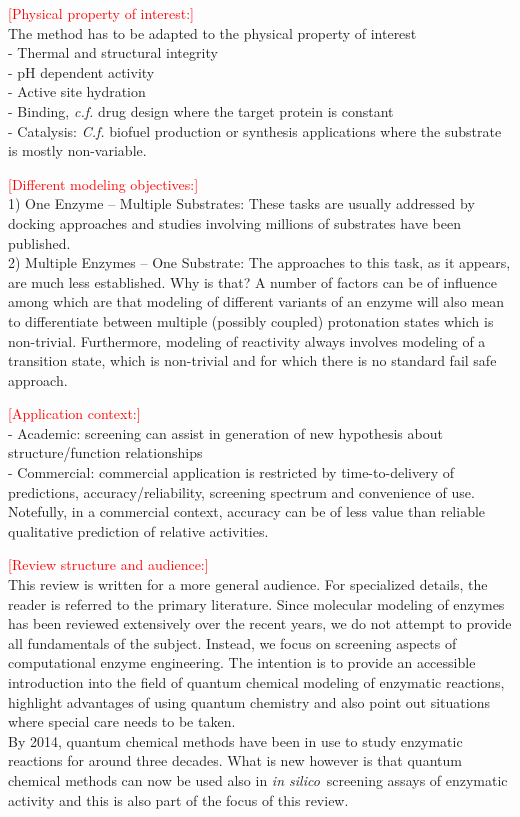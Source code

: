 \noindent\textcolor{red}{[Physical property of interest:]}\\
The method has to be adapted to the physical property of interest\\
- Thermal and structural integrity\\
- pH dependent activity\cite{ludwiczek2013strategies}\\
- Active site hydration\\
- Binding, \textit{c.f.} drug design where the target protein is constant\\
- Catalysis: \textit{C.f.} biofuel production or synthesis applications where the substrate is mostly non-variable.

\noindent\textcolor{red}{[Different modeling objectives:]}\\
1) One Enzyme -- Multiple Substrates:
These tasks are usually addressed by docking approaches and studies involving millions of substrates have been published\cite{zhou2010high}.\\
2) Multiple Enzymes -- One Substrate:
The approaches to this task, as it appears, are much less established.
Why is that?
A number of factors can be of influence among which are that modeling of different variants of an enzyme will also mean to differentiate between multiple (possibly coupled) protonation states which is non-trivial.
Furthermore, modeling of reactivity always involves modeling of a transition state, which is non-trivial and for which there is no standard fail safe approach.

\noindent\textcolor{red}{[Application context:]}\\
- Academic: screening can assist in generation of new hypothesis about structure/function relationships\\
- Commercial: commercial application is restricted by time-to-delivery of predictions, accuracy/reliability, screening spectrum and convenience of use.
Notefully, in a commercial context, accuracy can be of less value than reliable qualitative prediction of relative activities.

\noindent\textcolor{red}{[Review structure and audience:]}\\
This review is written for a more general audience.
For specialized details, the reader is referred to the primary literature.
Since molecular modeling of enzymes has been reviewed extensively over the recent years, we do not attempt to provide all fundamentals of the subject.
Instead, we focus on screening aspects of computational enzyme engineering.
The intention is to provide an accessible introduction into the field of quantum chemical modeling of enzymatic reactions, highlight advantages of using quantum chemistry and also point out situations where special care needs to be taken.\\
By 2014, quantum chemical methods have been in use to study enzymatic reactions for around three decades.
What is new however is that quantum chemical methods can now be used also in \textit{in silico} screening assays of enzymatic activity and this is also part of the focus of this review.


